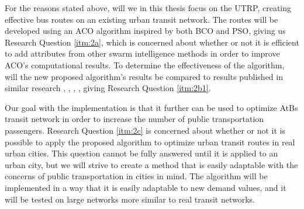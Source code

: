 For the reasons stated above, will we in this thesis focus on the UTRP, creating effective bus routes on an existing urban transit network. The routes will be developed using an ACO algorithm inspired by both BCO and PSO, giving us Research Question \vref{itm:2a}, which is concerned about whether or not it is efficient to add attributes from other swarm intelligence methods in order to improve ACO's computational results. To determine the effectiveness of the algorithm, will the new proposed algorithm's results be compared to results published in similar research \citep{kechagiopoulos14}, \citep{mandl79}, \citep{fan09}, \citep{nikolic14}, giving Research Question \vref{itm:2b1}. 

Our goal with the implementation is that it further can be used to optimize AtBs transit network in order to increase the number of public transportation passengers. Research Question \vref{itm:2c} is concerned about whether or not it is possible to apply the proposed algorithm to optimize urban transit routes in real urban cities. This question cannot be fully answered until it is applied to an urban city, but we will strive to create a method that is easily adaptable with the concerns of public transportation in cities in mind. The algorithm will be implemented in a way that it is easily adaptable to new demand values, and it will be tested on large networks more similar to real transit networks.


